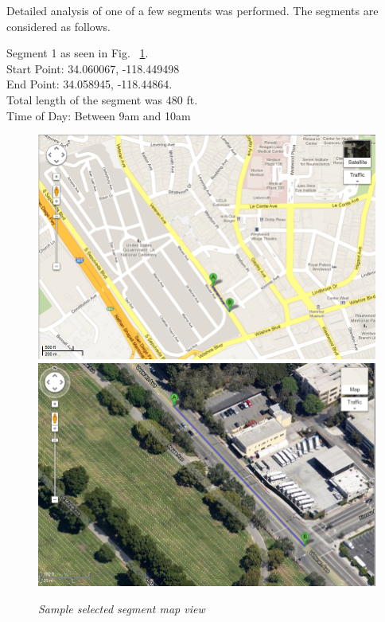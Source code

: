 \documentclass[12pt,fullpage,doublespace]{article}
\begin{document}
\newpage
Detailed analysis of one of a few segments was performed. The segments are considered as follows.
\begin{center}
Segment 1 as seen in Fig. ~\ref{fig:veteranSatellite}. \\
Start Point:  34.060067, -118.449498\\
End Point:  34.058945, -118.44864. \\
Total length of the segment was 480 ft.\\
Time of Day: Between 9am and 10am\\
\begin{figure}[h]
\begin{center}
\includegraphics[scale=0.32]{veteranMap.png}
\includegraphics[scale=0.32]{veteranSatellite.png}
\caption{\small \sl Sample selected segment map view}\label{fig:veteranSatellite}
\end{center}
\end{figure}
\end{center}
\end{document}
